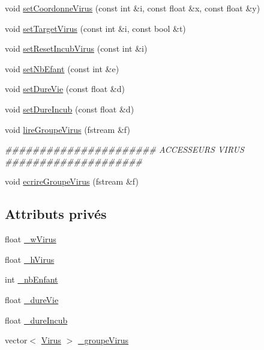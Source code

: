 \begin{DoxyCompactItemize}
void \hyperlink{classGroupeVirus_a95e0c5ab15fdf9f2eb9454822f1dc5af}{setCoordonneVirus} (const int \&i, const float \&x, const float \&y)
\item 
void \hyperlink{classGroupeVirus_ae7fc16dfad5fc492057a8dfa9edc36c4}{setTargetVirus} (const int \&i, const bool \&t)
\item 
void \hyperlink{classGroupeVirus_a242334f932e4191823bf26d2f4c3e555}{setResetIncubVirus} (const int \&i)
\item 
void \hyperlink{classGroupeVirus_a3a5cd7543cc7d6e4386c943585a95fa0}{setNbEfant} (const int \&e)
\item 
void \hyperlink{classGroupeVirus_ab4c815a82d26560ba58c02eb7515e317}{setDureVie} (const float \&d)
\item 
void \hyperlink{classGroupeVirus_a72a834fe4ac8a8801c56f1f4c9879f99}{setDureIncub} (const float \&d)
\item 
void \hyperlink{classGroupeVirus_a88e944b6c849306d287832a3aca1b7b0}{lireGroupeVirus} (fstream \&f)
\begin{DoxyCompactList}\small\item\em \#\#\#\#\#\#\#\#\#\#\#\#\#\#\#\#\#\#\#\#\#\# ACCESSEURS VIRUS \#\#\#\#\#\#\#\#\#\#\#\#\#\#\#\#\#\#\#\# \end{DoxyCompactList}\item 
void \hyperlink{classGroupeVirus_a35407b09672cb1056e226dc23b99dfb6}{ecrireGroupeVirus} (fstream \&f)
\end{DoxyCompactItemize}
\subsection*{Attributs privés}
\begin{DoxyCompactItemize}
\item 
float \hyperlink{classGroupeVirus_a134202eca48cc8f3fc90c2c575f9e334}{\_\-wVirus}
\item 
float \hyperlink{classGroupeVirus_a89251826c73f002fcb5c7c6f74a9c9b4}{\_\-hVirus}
\item 
int \hyperlink{classGroupeVirus_a74d8697c0c4c8988fe16b1c6c7947b1f}{\_\-nbEnfant}
\item 
float \hyperlink{classGroupeVirus_a13542f122af386a801801e16fc932358}{\_\-dureVie}
\item 
float \hyperlink{classGroupeVirus_a8c846fa3dd506b3e43a03544955627e4}{\_\-dureIncub}
\item 
vector$<$ \hyperlink{classVirus}{Virus} $>$ \hyperlink{classGroupeVirus_adfe8a98a8c6dffc0516223109d038ad4}{\_\-groupeVirus}
\end{DoxyCompactItemize}



